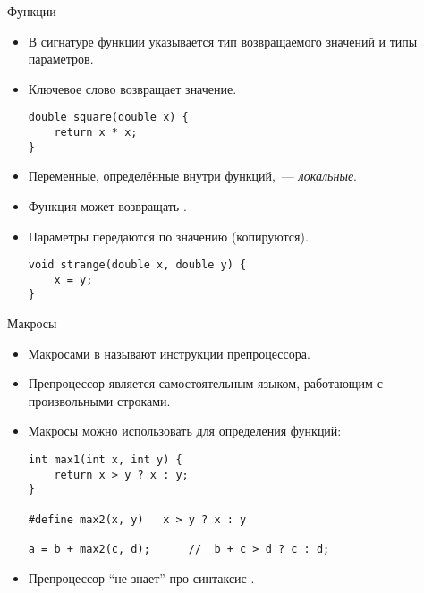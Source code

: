 \documentclass{beamer}
\begin{document}
\begin{frame}[fragile]{Функции}
\begin{itemize}
    \item В сигнатуре функции указывается тип возвращаемого значений и типы параметров.

    \item Ключевое слово  возвращает значение.
    \begin{lstlisting}
double square(double x) {
    return x * x;
}
    \end{lstlisting}

    \item Переменные, определённые внутри функций,~— {\em локальные}.
    
    \item Функция может возвращать .

    \item Параметры передаются по значению (копируются).

    \begin{lstlisting}
void strange(double x, double y) {
    x = y;
}
    \end{lstlisting}

\end{itemize}
\end{frame}

\begin{frame}[fragile]{Макросы}
\begin{itemize}
    \item Макросами в \langcpp называют инструкции препроцессора.

    \item Препроцессор \langcpp является самостоятельным языком,
        работающим с произвольными строками.

    \item Макросы можно использовать для определения функций:
    \begin{lstlisting}
int max1(int x, int y) { 
    return x > y ? x : y;
}

#define max2(x, y)   x > y ? x : y

a = b + max2(c, d);      //  b + c > d ? c : d;
    \end{lstlisting}

    \item Препроцессор ``не знает'' про синтаксис \langcpp.
    \end{itemize}
\end{frame}
\end{document}

